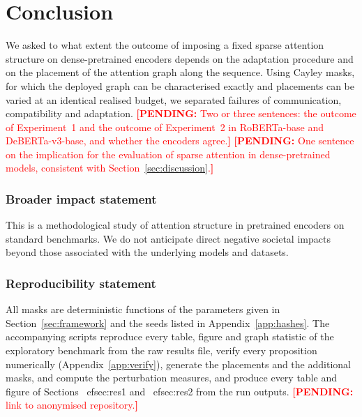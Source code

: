 \documentclass[10pt]{article}
\newcommand{\pending}[1]{\textcolor{red}{\textbf{[PENDING:} #1\textbf{]}}}
\begin{document}
\section{Conclusion}

We asked to what extent the outcome of imposing a fixed sparse attention structure on dense-pretrained encoders depends on the adaptation procedure and on the placement of the attention graph along the sequence. Using Cayley masks, for which the deployed graph can be characterised exactly and placements can be varied at an identical realised budget, we separated failures of communication, compatibility and adaptation. \pending{Two or three sentences: the outcome of Experiment~1 and the outcome of Experiment~2 in RoBERTa-base and DeBERTa-v3-base, and whether the encoders agree.} \pending{One sentence on the implication for the evaluation of sparse attention in dense-pretrained models, consistent with Section~\ref{sec:discussion}.}

\subsubsection*{Broader impact statement}
This is a methodological study of attention structure in pretrained encoders on standard benchmarks. We do not anticipate direct negative societal impacts beyond those associated with the underlying models and datasets.

\subsubsection*{Reproducibility statement}
All masks are deterministic functions of the parameters given in Section~\ref{sec:framework} and the seeds listed in Appendix~\ref{app:hashes}. The accompanying scripts reproduce every table, figure and graph statistic of the exploratory benchmark from the raw results file, verify every proposition numerically (Appendix~\ref{app:verify}), generate the placements and the additional masks, and compute the perturbation measures, and produce every table and figure of Sections~
ef{sec:res1} and~
ef{sec:res2} from the run outputs. \pending{link to anonymised repository.}




\appendix
\end{document}
